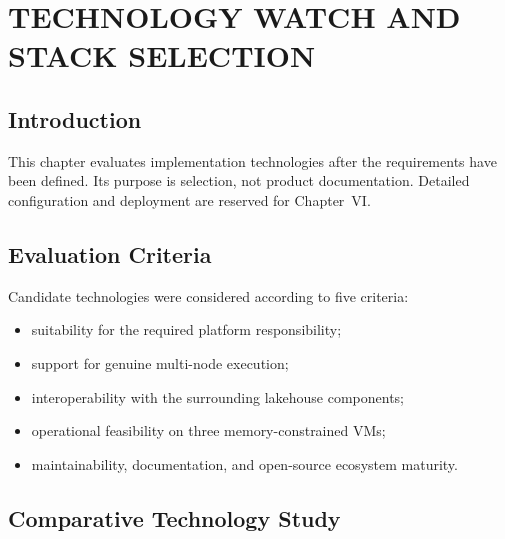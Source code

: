 \clearpage
\chapter{TECHNOLOGY WATCH AND STACK SELECTION}

\section{Introduction}
This chapter evaluates implementation technologies after the requirements have been defined. Its purpose is selection, not product documentation. Detailed configuration and deployment are reserved for Chapter~VI.

\section{Evaluation Criteria}
Candidate technologies were considered according to five criteria:
\begin{itemize}
    \item suitability for the required platform responsibility;
    \item support for genuine multi-node execution;
    \item interoperability with the surrounding lakehouse components;
    \item operational feasibility on three memory-constrained VMs;
    \item maintainability, documentation, and open-source ecosystem maturity.
\end{itemize}

\section{Comparative Technology Study}

